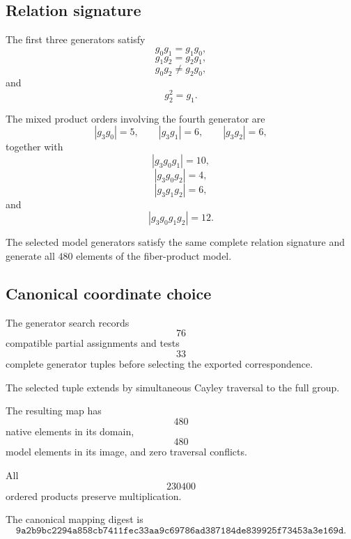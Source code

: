 \subsection{Relation signature}

The first three generators satisfy
\[
g_0g_1=g_1g_0,
\]
\[
g_1g_2=g_2g_1,
\]
\[
g_0g_2\neq g_2g_0,
\]
and
\[
g_2^2=g_1.
\]

The mixed product orders involving the fourth generator are
\[
|g_3g_0|=5,
\qquad
|g_3g_1|=6,
\qquad
|g_3g_2|=6,
\]
together with
\[
|g_3g_0g_1|=10,
\]
\[
|g_3g_0g_2|=4,
\]
\[
|g_3g_1g_2|=6,
\]
and
\[
|g_3g_0g_1g_2|=12.
\]

The selected model generators satisfy the same complete relation
signature and generate all $480$ elements of the fiber-product model.

\subsection{Canonical coordinate choice}

The generator search records
\[
76
\]
compatible partial assignments and tests
\[
33
\]
complete generator tuples before selecting the exported correspondence.

The selected tuple extends by simultaneous Cayley traversal to the full
group.

The resulting map has
\[
480
\]
native elements in its domain,
\[
480
\]
model elements in its image, and zero traversal conflicts.

All
\[
230400
\]
ordered products preserve multiplication.

The canonical mapping digest is
\[
\texttt{9a2b9bc2294a858cb7411fec33aa9c69786ad387184de839925f73453a3e169d}.
\]
